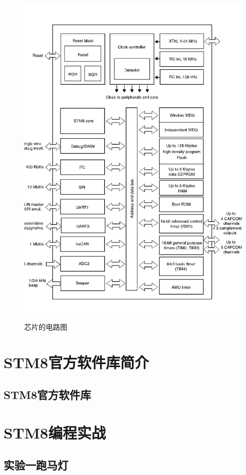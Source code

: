 \documentclass[a4paper]{book}
\newcommand{\prechap}{第}
\newcommand{\postchap}{章}
\newcommand{\chap}[1]{\newpage\thispagestyle{empty}\chapter{#1}\label{chap:\thechapter}}
\renewcommand{\appendixname}{}
\begin{document}
\begin{figure}[htbp]
\centering
\includegraphics{figures/circuit_diagram.jpg}
\caption{芯片的电路图}
\end{figure}

\chap{STM8官方软件库简介}

\section{STM8官方软件库}

\chap{STM8编程实战}

\section{实验一跑马灯}



\appendices
\renewcommand{\prechap}{\appendixname}
\renewcommand{\postchap}{}
\end{document}
